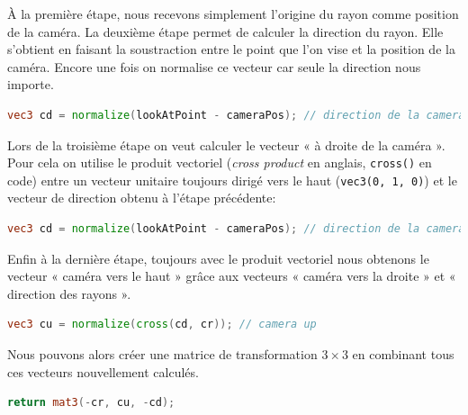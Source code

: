 À la première étape, nous recevons simplement l'origine du rayon comme position de la caméra. La deuxième étape permet de calculer la direction du rayon. Elle s'obtient en faisant la soustraction entre le point que l'on vise et la position de la caméra. Encore une fois on normalise ce vecteur car seule la direction nous importe.

\begin{minipage}{\linewidth}
\begin{lstlisting}[language=GLSL, caption=Direction de la caméra,captionpos=b,frame=single]
vec3 cd = normalize(lookAtPoint - cameraPos); // direction de la camera
\end{lstlisting}
\end{minipage}

Lors de la troisième étape on veut calculer le vecteur « à droite de la caméra ». Pour cela on utilise le produit vectoriel (\textit{cross product} en anglais, \lstinline{cross()} en code) entre un vecteur unitaire toujours dirigé vers le haut (\lstinline{vec3(0, 1, 0)}) et le vecteur de direction obtenu à l'étape précédente:

\begin{minipage}{\linewidth}
\begin{lstlisting}[language=GLSL, caption=Vecteur « à droite de la caméra »,captionpos=b]
vec3 cd = normalize(lookAtPoint - cameraPos); // direction de la camera
\end{lstlisting}
\end{minipage}

Enfin à la dernière étape, toujours avec le produit vectoriel nous obtenons le vecteur « caméra vers le haut » grâce aux vecteurs « caméra vers la droite » et « direction des rayons ».

\begin{minipage}{\linewidth}
\begin{lstlisting}[language=GLSL, caption=Vecteur « caméra vers le haut »,captionpos=b,frame=single]
vec3 cu = normalize(cross(cd, cr)); // camera up
\end{lstlisting}
\end{minipage}

Nous pouvons alors créer une matrice de transformation $3\times3$ en combinant tous ces vecteurs nouvellement calculés.

\begin{minipage}{\linewidth}
\begin{lstlisting}[language=GLSL, caption=Matrice $3\times3$ pour la caméra,captionpos=b,frame=single]
return mat3(-cr, cu, -cd);
\end{lstlisting}
\end{minipage}


